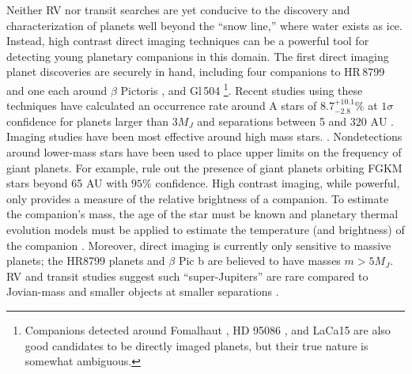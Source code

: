 Neither RV nor transit searches are yet conducive to the discovery and characterization of planets well beyond the ``snow line,'' where water exists as ice. Instead, high contrast direct imaging techniques can be a powerful tool for detecting young planetary companions in this domain. The first direct imaging planet discoveries are securely in hand, including four companions to HR\,8799 \citep{Marois08, Marois10} and one each around $\beta$ Pictoris \citep{Lagrange09}, and Gl\,504 \citep{Kuzuhara13}\footnote{Companions detected around Fomalhaut \citep{Kalas08, Currie12}, HD 95086 \citep{Rameau13}, and LaCa15 \citep{Kraus12} are also good candidates to be directly imaged planets, but their true nature is somewhat ambiguous.}. Recent studies using these techniques have calculated an occurrence rate around A stars of $8.7^{+10.1}_{-2.8}\%$ at $1\sigma$ confidence for planets larger than $3 M_J$ and separations between 5 and $320 \textrm{ AU}$ \citep{Vigan12}. Imaging studies have been most effective around high mass stars. \citep{Crepp11, Carson13}. Nondetections around lower-mass stars have been used to place upper limits on the frequency of giant planets. For example, \citet{Nielsen10} rule out the presence of giant planets orbiting FGKM stars beyond 65 AU with $95\%$ confidence. High contrast imaging, while powerful, only provides a measure of the relative brightness of a companion. To estimate the companion's mass, the age of the star must be known and planetary thermal evolution models must be applied to estimate the temperature (and brightness) of the companion \citep{Chabrier00, Baraffe03}. Moreover, direct imaging is currently only sensitive to massive planets; the HR8799 planets and $\beta$ Pic b are believed to have masses $m > 5 M_J$. RV and transit studies suggest such ``super-Jupiters'' are rare compared to Jovian-mass and smaller objects at smaller separations \citep{Howard10b, Howard12}.

